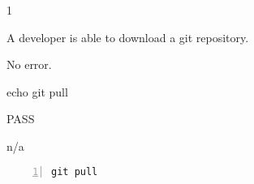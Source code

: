 \begin{description}[align=right,leftmargin=3.2cm,labelindent=3.0cm]
\item[Step:] 1
\item[Confirm:] A developer is able to download a git repository.
\item[Expectation:] No error.
\item[Command:] echo git  pull
\item[Test Result:] PASS
\item[Evidence:] n/a
\end{description}
\begin{lstlisting}[numbers=left]
git pull

\end{lstlisting}
